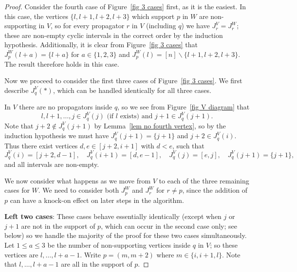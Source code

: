 \documentclass[11pt]{article}
\theoremstyle{remark}
\theoremstyle{definition}
\begin{document}
\begin{proof}
Consider the fourth case of Figure~\ref{fig 3 cases} first, as it is the easiest.  In this case, the vertices $\{l,l+1,l+2,l+3 \}$ which support $p$ in $W$ are non-supporting in $V$, so for every propagator $r$ in $V$ (including $q$) we have $J_r^{V} = J_r^{W}$; these are non-empty cyclic intervals in the correct order by the induction hypothesis.  Additionally, it is clear from Figure~\ref{fig 3 cases} that $J_p^{W}(l+a) = \{l+a\}$ for $a\in\{1,2,3\}$ and $J_p^{W}(l) = [n] \backslash \{l+1, l+2, l+3\}$. The result therefore holds in this case.


Now we proceed to consider the first three cases of Figure~\ref{fig 3 cases}.
We first describe $J_q^{V}(*)$, which can be handled identically for all three cases.

In $V$ there are no propagators inside $q$, so we see from Figure~\ref{fig V diagram} that
\[l, l+1, \ldots ,j \in J^{V}_q(j) \text{ (if $l$ exists) and }  j+1 \in J^{V}_q(j+1).\]
Note that $j+2 \not\in J^{V}_q(j+1)$ by Lemma~\ref{lem no fourth vertex}, so by the induction hypothesis we must have $J^{V}_q(j+1) = \{j+1\}$ and $j+2 \in J^{V}_q(i)$. Thus there exist vertices $d,e \in [j+2,i+1]$ with $d <e$, such that
\[J^{V}_q(i) = [j+2,d-1], \quad J^{V}_q(i+1) = [d,e-1], \quad J^{V}_q(j) = [e,j], \quad J^{V}_q(j+1) = \{j+1\},\]
and all intervals are non-empty.




We now consider what happens as we move from $V$ to each of the three remaining cases for $W$. We need to consider both $J^{W}_p$ and $J^{W}_r$ for $r \neq p$, since the addition of $p$ can have a knock-on effect on later steps in the algorithm.


\textbf{Left two cases}: These cases behave essentially identically (except when $j$ or $j+1$ are not in the support of $p$, which can occur in the second case only; see below) so we handle the majority of the proof for these two cases simultaneously. Let $1\leq a\leq 3$ be the number of non-supporting vertices inside $q$ in $V$; so these vertices are $l, \ldots, l+a-1$.  Write $p=(m,m+2)$ where $m\in \{i, i+1, l\}$.  Note that $l, \ldots, l+a-1$ are all in the support of $p$.


\end{proof}
\end{document}
